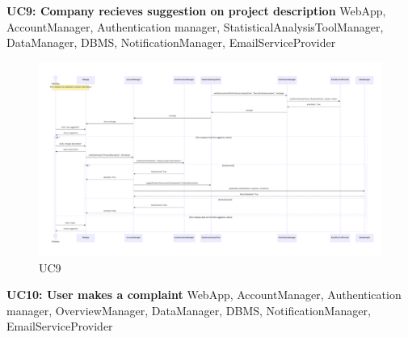 \newpage
\textbf{UC9: Company recieves suggestion on project description}
WebApp, AccountManager, Authentication manager, StatisticalAnalysisToolManager, DataManager, DBMS, NotificationManager, EmailServiceProvider

\begin{figure}[H]
    \centering
    \hspace{-1 cm} %
    \includegraphics[width=1.1\linewidth]{DD//Images/SequenceDiagrams/UC9.pdf}
    \caption{UC9}
\end{figure}

\newpage
\textbf{UC10: User makes a complaint}
WebApp, AccountManager, Authentication manager, OverviewManager, DataManager, DBMS, NotificationManager, EmailServiceProvider

